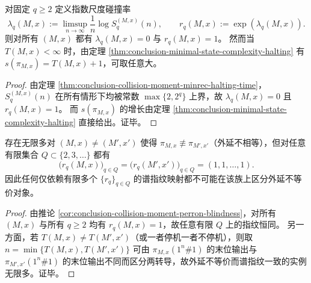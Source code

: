 \begin{corollary}[指数尺度碰撞谱指纹对停机时间不敏感]\label{cor:conclusion-collision-moment-perron-blindness}
对固定 \(q\ge 2\) 定义指数尺度碰撞率
\[
\lambda_q(M,x):=\limsup_{n\to\infty}\frac{1}{n}\log S_q^{(M,x)}(n),
\qquad
r_q(M,x):=\exp(\lambda_q(M,x)).
\]
则对所有 \((M,x)\) 都有 \(\lambda_q(M,x)=0\) 与 \(r_q(M,x)=1\)。
然而当 \(T(M,x)<\infty\) 时，由定理 \ref{thm:conclusion-minimal-state-complexity-halting} 有 \(s(\pi_{M,x})=T(M,x)+1\)，可取任意大。
\end{corollary}
\begin{proof}
由定理 \ref{thm:conclusion-collision-moment-minrec-halting-time}，\(S_q^{(M,x)}(n)\) 在所有情形下均被常数 \(\max\{2,2^q\}\) 上界，故 \(\lambda_q(M,x)=0\) 且 \(r_q(M,x)=1\)。
而 \(s(\pi_{M,x})\) 的增长由定理 \ref{thm:conclusion-minimal-state-complexity-halting} 直接给出。证毕。
\end{proof}

\begin{corollary}[有限碰撞谱指纹不可能构成完备不变量]\label{cor:conclusion-finite-collision-spectrum-incomplete}
存在无限多对 \((M,x)\neq(M',x')\) 使得 \(\pi_{M,x}\not\equiv \pi_{M',x'}\)（外延不相等），但对任意有限集合 \(Q\subset\{2,3,\dots\}\) 都有
\[
\bigl(r_q(M,x)\bigr)_{q\in Q}=\bigl(r_q(M',x')\bigr)_{q\in Q}=(1,1,\dots,1).
\]
因此任何仅依赖有限多个 \(\{r_q\}_{q\in Q}\) 的谱指纹映射都不可能在该族上区分外延不等价对象。
\end{corollary}
\begin{proof}
由推论 \ref{cor:conclusion-collision-moment-perron-blindness}，对所有 \((M,x)\) 与所有 \(q\ge 2\) 均有 \(r_q(M,x)=1\)，故任意有限 \(Q\) 上的指纹恒同。
另一方面，若 \(T(M,x)\neq T(M',x')\)（或一者停机一者不停机），则取 \(n=\min\{T(M,x),T(M',x')\}\) 可由 \(\pi_{M,x}(1^n\#1)\) 的末位输出与 \(\pi_{M',x'}(1^n\#1)\) 的末位输出不同而区分两转导，故外延不等价而谱指纹一致的实例无限多。证毕。
\end{proof}

